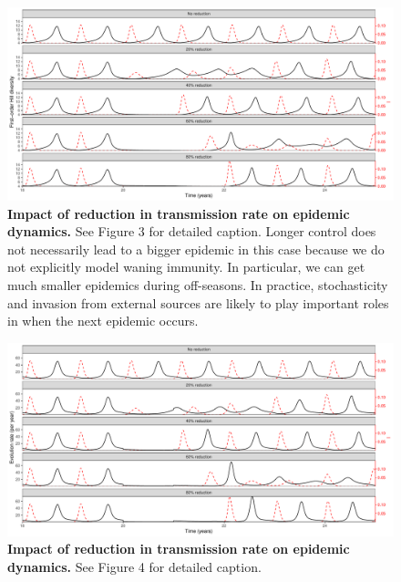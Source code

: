 \documentclass[12pt]{article}
\begin{document}
\begin{figure}[!h]
\includegraphics[width=\textwidth]{../figure/figure_flu_ode_1year_4.pdf}
\caption{
\textbf{Impact of reduction in transmission rate on epidemic dynamics.}
See Figure 3 for detailed caption.
Longer control does not necessarily lead to a bigger epidemic in this case because we do not explicitly model waning immunity.
In particular, we can get much smaller epidemics during off-seasons.
In practice, stochasticity and invasion from external sources are likely to play important roles in when the next epidemic occurs.
}
\end{figure}

\pagebreak

\begin{figure}[!h]
\includegraphics[width=\textwidth]{../figure/figure_flu_ode_1year_5.pdf}
\caption{
\textbf{Impact of reduction in transmission rate on epidemic dynamics.}
See Figure 4 for detailed caption.
}
\end{figure}

\pagebreak


\end{document}
